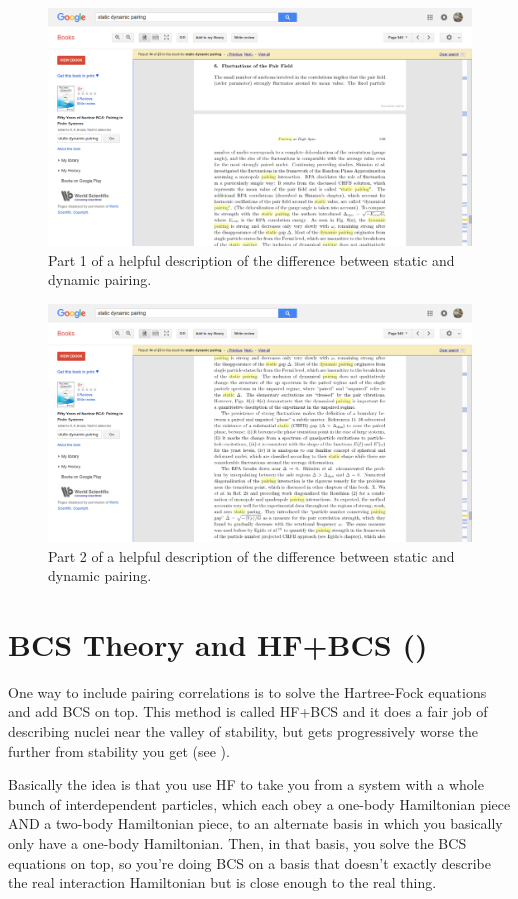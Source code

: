\begin{figure}
\centering
\includegraphics[width=0.7\linewidth]{TeX_files/static_dynamic_pairing1}
\caption{Part 1 of a helpful description of the difference between static and dynamic pairing.}
\label{fig:static_dynamic_pairing1}
\end{figure}

\begin{figure}
\centering
\includegraphics[width=0.7\linewidth]{TeX_files/static_dynamic_pairing2}
\caption{Part 2 of a helpful description of the difference between static and dynamic pairing.}
\label{fig:static_dynamic_pairing2}
\end{figure}


\section*{BCS Theory and HF+BCS (\cite{suhonen2007nucleons,Anguiano2013})}
One way to include pairing correlations is to solve the Hartree-Fock equations and add BCS on top. This method is called HF+BCS and it does a fair job of describing nuclei near the valley of stability, but gets progressively worse the further from stability you get (see \cite{Anguiano2013}).

Basically the idea is that you use HF to take you from a system with a whole bunch of interdependent particles, which each obey a one-body Hamiltonian piece AND a two-body Hamiltonian piece, to an alternate basis in which you basically only have a one-body Hamiltonian. Then, in that basis, you solve the BCS equations on top, so you're doing BCS on a basis that doesn't exactly describe the real interaction Hamiltonian but is close enough to the real thing.

